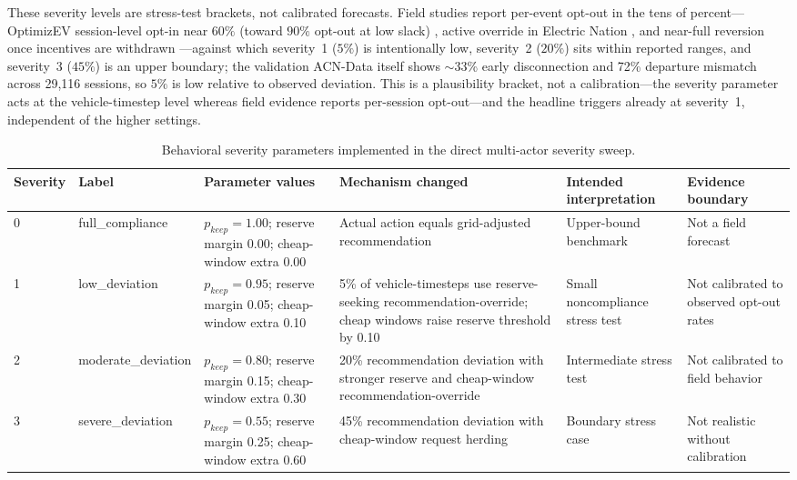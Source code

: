 \documentclass[12pt]{article}
\begin{document}
These severity levels are stress-test brackets, not calibrated forecasts. Field studies report per-event opt-out in the tens of percent---OptimizEV session-level opt-in near $60\%$ (toward $90\%$ opt-out at low slack) \cite{alexeenko2023pilot}, active override in Electric Nation \cite{dudek2021electricnation}, and near-full reversion once incentives are withdrawn \cite{bailey2025fieldexp,wong2023incentives,marxen2023flexibility}---against which severity~1 ($5\%$) is intentionally low, severity~2 ($20\%$) sits within reported ranges, and severity~3 ($45\%$) is an upper boundary; the validation ACN-Data itself shows $\sim$33\% early disconnection and 72\% departure mismatch across 29{,}116 sessions, so $5\%$ is low relative to observed deviation. This is a plausibility bracket, not a calibration---the severity parameter acts at the vehicle-timestep level whereas field evidence reports per-session opt-out---and the headline triggers already at severity~1, independent of the higher settings.

\begin{table}[p]
\centering
\caption{Behavioral severity parameters implemented in the direct multi-actor severity sweep.}
\label{tab:severityparams}
\tiny
\begin{tabularx}{\textwidth}{p{}p{}p{}Yp{0.16\textwidth}p{0.16\textwidth}}
\hline
Severity & Label & Parameter values & Mechanism changed & Intended interpretation & Evidence boundary \\
 & full\_compliance & $p_{keep}=1.00$; reserve margin 0.00; cheap-window extra 0.00 & Actual action equals grid-adjusted recommendation & Upper-bound benchmark & Not a field forecast \\
1 & low\_deviation & $p_{keep}=0.95$; reserve margin 0.05; cheap-window extra 0.10 & 5\% of vehicle-timesteps use reserve-seeking recommendation-override; cheap windows raise reserve threshold by 0.10 & Small noncompliance stress test & Not calibrated to observed opt-out rates \\
2 & moderate\_deviation & $p_{keep}=0.80$; reserve margin 0.15; cheap-window extra 0.30 & 20\% recommendation deviation with stronger reserve and cheap-window recommendation-override & Intermediate stress test & Not calibrated to field behavior \\
3 & severe\_deviation & $p_{keep}=0.55$; reserve margin 0.25; cheap-window extra 0.60 & 45\% recommendation deviation with cheap-window request herding & Boundary stress case & Not realistic without calibration \\
\hline
\end{tabularx}
\end{table}
\end{document}
